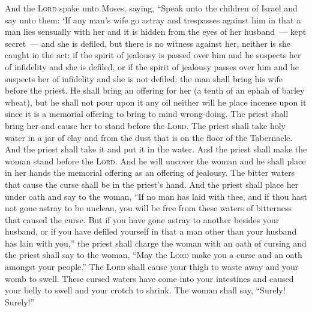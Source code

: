 \begin{inparaenum}
   And the \textsc{Lord} spake unto Moses, saying,%
   ``Speak unto the children of Israel and say unto them: `If any man's wife go astray and trespasses against him%
   in that a man lies sensually with her and it is hidden from the eyes of her husband~--- kept secret~--- and she is defiled, but there is no witness against her, neither is she caught in the act:%
   if the spirit of jealousy is passed over him and he suspects her of infidelity and she is defiled, or if the spirit of jealousy passes over him and he suspects her of infidelity and she is not defiled:%
   the man shall bring his wife before the priest. He shall bring an offering for her (a tenth of an ephah of barley wheat), but he shall not pour upon it any oil neither will he place incense upon it since it is a memorial offering to bring to mind wrong-doing.%
   The priest shall bring her and cause her to stand before the \textsc{Lord}.%
   The priest shall take holy water in a jar of clay and from the dust that is on the floor of the Tabernacle. And the priest shall take it and put it in the water.%
   And the priest shall make the woman stand before the \textsc{Lord}. And he will uncover the woman and he shall place in her hands the memorial offering as an offering of jealousy. The bitter waters that cause the curse shall be in the priest's hand.%
   And the priest shall place her under oath and say to the woman, ``If no man has laid with thee, and if thou hast not gone astray to be unclean, you will be free from these waters of bitterness that caused the curse.%
   But if you have gone astray to another besides your husband, or if you have defiled yourself in that a man other than your husband has lain with you,''%
   the priest shall charge the woman with an oath of cursing and the priest shall say to the woman, ``May the \textsc{Lord} make you a curse and an oath amongst your people.'' The \textsc{Lord} shall cause your thigh to waste away and your womb to swell.%
   These cursed waters have come into your intestines and caused your belly to swell and your crotch to shrink. The woman shall say, ``Surely! Surely!''%

\end{inparaenum}
